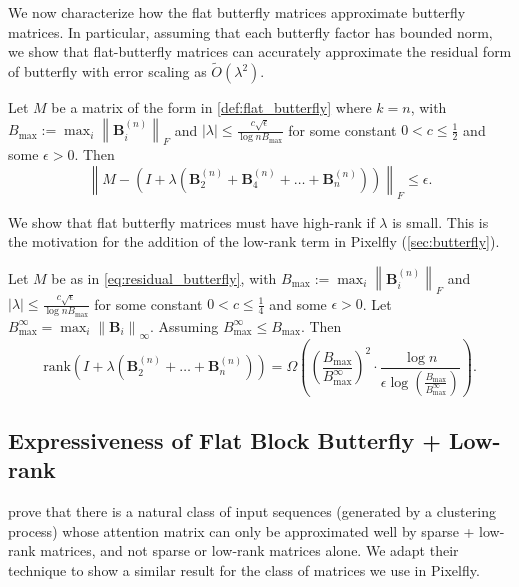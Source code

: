 We now characterize how the flat butterfly matrices approximate butterfly matrices. In particular, assuming that each butterfly factor has bounded norm, we show that flat-butterfly matrices can accurately approximate the residual form of butterfly with error scaling as $\widetilde{O}(\lambda^2)$.

\begin{theorem}
  \label{thm:flat_butterfly_approx}
  Let $M$ be a matrix of the form in \ref{def:flat_butterfly} where $k = n$, with
  $B_\mathrm{max} := \max_{i} \left\|{\mathbf{B}_i^{(n)}}\right\|_F$ and
  $\left\lvert\lambda\right\rvert \leq \frac{c \sqrt{\epsilon}}{\log n B_\mathrm{max}}$ for some constant $0 < c \leq \frac{1}{2}$ and some $\epsilon > 0$. Then
  \begin{equation*}
    \left\|{M - \left( I + \lambda (\mathbf{B}_2^{(n)} + \mathbf{B}_{4}^{(n)} + \dots + \mathbf{B}_n^{(n)}) \right)}\right\|_F \leq \epsilon.
  \end{equation*}
\end{theorem}

We show that flat butterfly matrices must have high-rank if $\lambda$ is small. This is the motivation for the addition of the low-rank term in Pixelfly (\ref{sec:butterfly}).

\begin{theorem}
  \label{thm:flat_butterfly_rank}
  Let $M$ be as in \ref{eq:residual_butterfly}, with
  $B_\mathrm{max} := \max_{i} \left\|{\mathbf{B}_i^{(n)}}\right\|_F$ and
  $\left\lvert\lambda\right\rvert \leq \frac{c \sqrt{\epsilon}}{\log n B_\mathrm{max}}$ for some constant $0 < c \leq \frac{1}{4}$ and some $\epsilon > 0$. Let $B^\infty_\mathrm{max} = \max_i \left\|{\mathbf{B}_i}\right\|_\infty$.
  Assuming $B^\infty_\mathrm{max} \leq B_\mathrm{max}$.
  Then
  \begin{equation*}
    \mathrm{rank}(I + \lambda (\mathbf{B}_2^{(n)} + \dots + \mathbf{B}_n^{(n)})) = \Omega \left( \left( \frac{B_\mathrm{max}}{B^\infty_\mathrm{max}} \right)^2 \cdot \frac{\log n}{\epsilon \log \left( \frac{B_\mathrm{max}}{B^\infty_\mathrm{max}} \right)} \right).
  \end{equation*}
\end{theorem}

\subsection{Expressiveness of Flat Block Butterfly + Low-rank}

\citet{scatterbrain} prove that there is a natural class of input sequences (generated by a clustering process) whose attention matrix can only be approximated well by sparse + low-rank matrices, and not sparse or low-rank matrices alone. We adapt their technique to show a similar result for the class of matrices we use in Pixelfly.

